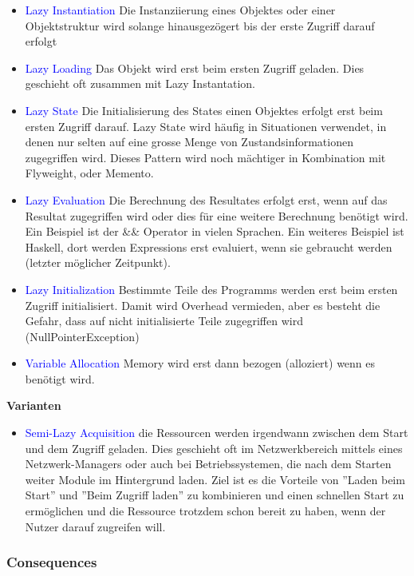 \begin{itemize}
    \item \textcolor{blue}{Lazy Instantiation} Die Instanziierung eines Objektes oder einer Objektstruktur wird solange hinausgezögert bis der erste Zugriff darauf erfolgt
    \item \textcolor{blue}{Lazy Loading} Das Objekt wird erst beim ersten Zugriff geladen. Dies geschieht oft zusammen mit Lazy Instantation.
    \item \textcolor{blue}{Lazy State} Die Initialisierung des States einen Objektes erfolgt erst beim ersten Zugriff darauf. Lazy State wird häufig in Situationen verwendet, in denen nur selten auf eine grosse Menge von Zustandsinformationen zugegriffen wird. Dieses Pattern wird noch mächtiger in Kombination mit Flyweight, oder Memento.
    \item \textcolor{blue}{Lazy Evaluation} Die Berechnung des Resultates erfolgt erst, wenn auf das Resultat zugegriffen wird oder dies für eine weitere Berechnung benötigt wird. Ein Beispiel ist der \&\& Operator in vielen Sprachen. Ein weiteres Beispiel ist Haskell, dort werden Expressions erst evaluiert, wenn sie gebraucht werden (letzter möglicher Zeitpunkt).
    \item \textcolor{blue}{Lazy Initialization} Bestimmte Teile des Programms werden erst beim ersten Zugriff initialisiert. Damit wird Overhead vermieden, aber es besteht die Gefahr, dass auf nicht initialisierte Teile zugegriffen wird (NullPointerException)
    \item \textcolor{blue}{Variable Allocation} Memory wird erst dann bezogen (alloziert) wenn es benötigt wird.
\end{itemize}
\vspace{10pt}
\textbf{Varianten}

\begin{itemize}
    \item \textcolor{blue}{Semi-Lazy Acquisition} die Ressourcen werden irgendwann zwischen dem Start und dem Zugriff geladen. Dies geschieht oft im Netzwerkbereich mittels eines Netzwerk-Managers oder auch bei Betriebssystemen, die nach dem Starten weiter Module im Hintergrund laden. Ziel ist es die Vorteile von ''Laden beim Start'' und ''Beim Zugriff laden'' zu kombinieren und einen schnellen Start zu ermöglichen und die Ressource trotzdem schon bereit zu haben, wenn der Nutzer darauf zugreifen will.
\end{itemize}

\subsubsection{Consequences}

